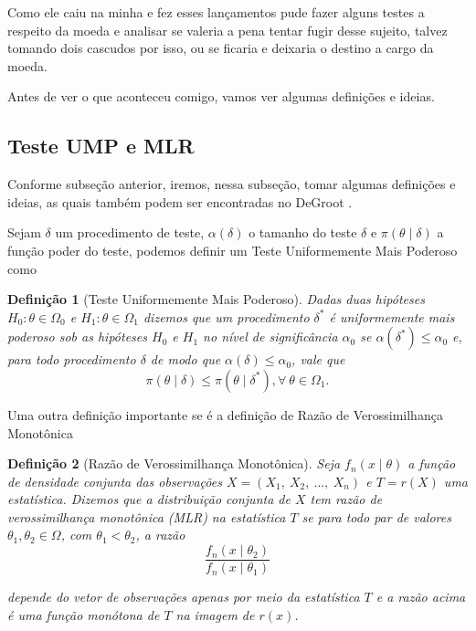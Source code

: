 \documentclass{article}
\newtheorem{definition}{Definição}
\begin{document}
Como ele caiu na minha e fez esses lançamentos pude fazer alguns testes a respeito da moeda e analisar se valeria a pena tentar fugir desse sujeito, talvez tomando dois cascudos por isso, ou se ficaria e deixaria o destino a cargo da moeda.

Antes de ver o que aconteceu comigo, vamos ver algumas definições e ideias.

\subsection*{Teste UMP e MLR}

Conforme subseção anterior, iremos, nessa subseção,  tomar algumas definições e ideias, as quais também podem ser encontradas no DeGroot \cite{degroot}.

Sejam $\delta$ um procedimento de teste, $\alpha(\delta)$ o tamanho do teste $\delta$ e $\pi(\theta \mid \delta)$ a função poder do teste, podemos definir um Teste Uniformemente Mais Poderoso como
\begin{definition}[Teste Uniformemente Mais Poderoso]
    Dadas duas hipóteses $H_0 : \theta \in \Omega_0$ e $H_1 : \theta \in \Omega_1$ dizemos que um procedimento $\delta^*$ é uniformemente mais poderoso sob as hipóteses $H_0$ e $H_1$ no nível de significância $\alpha_0$ se $\alpha(\delta^*) \leq \alpha_0$ e, para todo procedimento $\delta$ de modo que $\alpha(\delta) \leq \alpha_0$, vale que
    \[\pi(\theta \mid \delta) \leq \pi(\theta \mid \delta^*), \forall ~\theta \in \Omega_1.\]
\end{definition}

Uma outra definição importante se é a definição de Razão de Verossimilhança Monotônica
\begin{definition}[Razão de Verossimilhança Monotônica]
    Seja $f_n(x \mid \theta)$ a função de densidade conjunta das observações $X = \left(X_1, ~X_2, ~\dots, ~X_n\right)$ e $T = r(X)$ uma estatística. Dizemos que a distribuição conjunta de $X$ tem razão de verossimilhança monotônica (MLR) na estatística $T$ se para todo par de valores $\theta_1, \theta_2 \in \Omega$, com $\theta_1 < \theta_2$, a razão
    \begin{equation}
        \label{MLR}
        \dfrac{f_n(x \mid \theta_2)}{f_n(x \mid \theta_1)}
    \end{equation}
    
    \noindent depende do vetor de observações apenas por meio da estatística $T$ e a razão acima é uma função monótona de $T$ na imagem de $r(x)$.
\end{definition}
\end{document}

